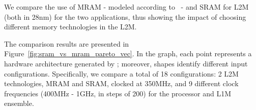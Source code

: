 We compare the use of MRAM - modeled according to~\cite{8310393} - and SRAM for L2M (both in 28nm) for the two applications, thus showing the impact of choosing different memory technologies in the L2M.

\label{ssec:exp_single}


\label{ssec:case_study2}

The comparison results are presented in Figure~\ref{fig:sram_vs_mram_pareto_vec}. In the graph, each point represents a hardware architecture generated by \frameworkname; moreover, shapes identify different input configurations. Specifically, we compare a total of 18 configurations: 2 L2M technologies, MRAM and SRAM, clocked at 350MHz, and 9 different clock frequencies (400MHz - 1GHz, in steps of 200) for the processor and L1M ensemble.

